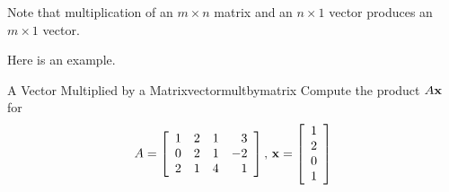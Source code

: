 Note that multiplication of an $m \times n$ matrix and an $n \times 1$ vector produces an $m \times 1$ vector.

Here is an example.

\begin{example}{A Vector Multiplied by a Matrix}{vectormultbymatrix}
Compute the product $A\mathbf{x}$ for 
\begin{equation*}
A = \left[
\begin{array}{rrrr}
1 & 2 & 1 & 3 \\
0 & 2 & 1 & -2 \\
2 & 1 & 4 & 1
\end{array}
\right],\,  \mathbf{x} =  \left[
\begin{array}{r}
1 \\
2 \\
0 \\
1
\end{array}
\right] 
\end{equation*}
\end{example}

